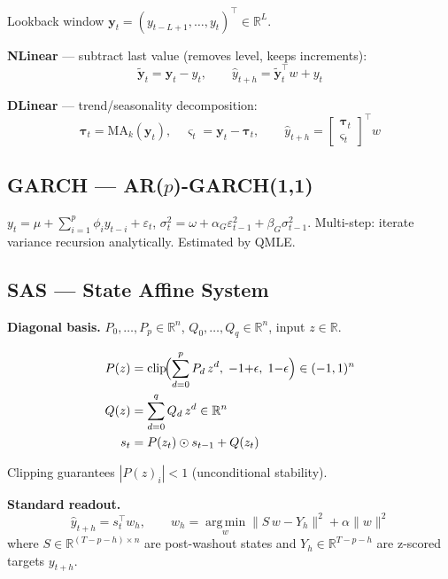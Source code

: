 \documentclass[11pt, a4paper]{article}
\newcommand{\R}{\mathbb{R}}
\newcommand{\W}{w}
\begin{document}
Lookback window $\bm{y}_t = (y_{t-L+1},\ldots,y_t)^\top \in \R^L$.

\textbf{NLinear} — subtract last value (removes level, keeps increments):
\begin{equation}
  \tilde{\bm{y}}_t = \bm{y}_t - y_t, \qquad
  \hat{y}_{t+h} = \tilde{\bm{y}}_t^\top \W + y_t
\end{equation}

\textbf{DLinear} — trend/seasonality decomposition:
\begin{equation}
  \bm{\tau}_t = \mathrm{MA}_k(\bm{y}_t), \quad
  \bm{\varsigma}_t = \bm{y}_t - \bm{\tau}_t, \qquad
  \hat{y}_{t+h} = \begin{bmatrix}\bm{\tau}_t \\ \bm{\varsigma}_t\end{bmatrix}^\top \W
\end{equation}

\subsection{GARCH — AR($p$)-GARCH(1,1)}

$y_t = \mu + \sum_{i=1}^{p} \phi_i y_{t-i} + \varepsilon_t$,\quad
$\sigma^2_t = \omega + \alpha_{\scriptscriptstyle G}\varepsilon^2_{t-1}
            + \beta_{\scriptscriptstyle G}\sigma^2_{t-1}$.
Multi-step: iterate variance recursion analytically. Estimated by QMLE.

\subsection{SAS — State Affine System}

\textbf{Diagonal basis.}
$P_0,\ldots,P_p \in \R^n$,\; $Q_0,\ldots,Q_q \in \R^n$, input $z\in\mathbb R$.

\begin{align}
  P(z) &= \mathrm{clip}\!\Bigl(\sum_{d=0}^{p} P_d\,z^d,\;
           {-1{+}\epsilon},\;{1{-}\epsilon}\Bigr) \in (-1,1)^n \\
  Q(z) &= \sum_{d=0}^{q} Q_d\,z^d \in \R^n \\
  s_t  &= P(z_t) \odot s_{t-1} + Q(z_t)
\end{align}

Clipping guarantees $|P(z)_i|<1$ (unconditional stability).

\textbf{Standard readout.}
\begin{equation}
  \hat{y}_{t+h} = s_t^\top \W_h, \qquad
  \W_h = \operatorname*{arg\,min}_{w} \|S\,w - Y_h\|^2 + \alpha\|w\|^2
\end{equation}
where $S \in \R^{(T-p-h)\times n}$ are post-washout states and
$Y_h \in \R^{T-p-h}$ are z-scored targets $y_{t+h}$.
\end{document}
